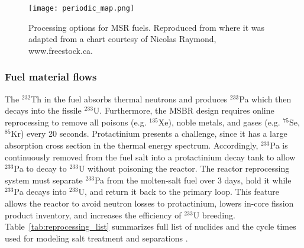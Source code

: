\begin{figure}[htp!] %
  \texttt{[image: periodic\_map.png]}
  \caption{Processing options for \gls{MSR} fuels. 
          Reproduced from \cite{ahmad_neutronics_2015} where it was adapted 
          from a chart courtesy of Nicolas 
          Raymond, www.freestock.ca.}
  \label{fig:periodic_tab}
\end{figure}

\subsubsection{Fuel material flows}
The $^{232}$Th in the fuel absorbs thermal neutrons and produces $^{233}$Pa 
which then decays into the fissile $^{233}$U. Furthermore, the \gls{MSBR} 
design requires online reprocessing to remove all poisons (e.g. $^{135}$Xe), 
noble metals, and gases (e.g. $^{75}$Se, $^{85}$Kr) every 20 seconds. 
Protactinium presents a challenge, since it has a large absorption cross 
section in the thermal energy spectrum. Accordingly, $^{233}$Pa is continuously 
removed from the fuel salt into a protactinium decay tank to allow $^{233}$Pa 
to decay to $^{233}$U without poisoning the reactor. The reactor reprocessing 
system must separate $^{233}$Pa from the molten-salt fuel over 3 
days, hold it while $^{233}$Pa decays into $^{233}$U, and return it back to the 
primary loop. This feature allows the reactor to avoid neutron losses to 
protactinium, lowers in-core fission product inventory, and increases the 
efficiency of $^{233}$U breeding. Table~\ref{tab:reprocessing_list} summarizes 
full list of nuclides and the cycle times used for modeling salt treatment and 
separations \cite{robertson_conceptual_1971}. 

